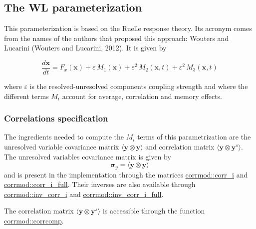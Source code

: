 \subsection*{The WL parameterization}

This parameterization is based on the Ruelle response theory. Its acronym comes from the names of the authors that proposed this approach\+: Wouters and Lucarini (Wouters and Lucarini, 2012). It is given by

\[\frac{d\boldsymbol{x}}{dt} = F_x(\boldsymbol{x}) + \varepsilon \, M_1(\boldsymbol{x}) + \varepsilon^2 \, M_2(\boldsymbol{x},t) + \varepsilon^2 \, M_3 (\boldsymbol{x},t)\]

where $\varepsilon$ is the resolved-\/unresolved components coupling strength and where the different terms $M_i$ account for average, correlation and memory effects.

\subsubsection*{Correlations specification}

The ingredients needed to compute the $M_i$ terms of this parametrization are the unresolved variable covariance matrix $\langle \boldsymbol y \otimes \boldsymbol y \rangle$ and correlation matrix $\langle \boldsymbol y \otimes \boldsymbol y^s \rangle$. The unresolved variables covariance matrix is given by \[\boldsymbol\sigma_y = \langle \boldsymbol y \otimes \boldsymbol y \rangle \] and is present in the implementation through the matrices \hyperlink{namespacecorrmod_a859a67113b5271db0df70e60cbf0687b}{corrmod\+::corr\+\_\+i} and \hyperlink{namespacecorrmod_a978b78f1d6906afe06e63768535b44f7}{corrmod\+::corr\+\_\+i\+\_\+full}. Their inverses are also available through \hyperlink{namespacecorrmod_a5a938587078064124588605255e93a19}{corrmod\+::inv\+\_\+corr\+\_\+i} and \hyperlink{namespacecorrmod_af2ab9712d246a94ae1a801a011aee3d8}{corrmod\+::inv\+\_\+corr\+\_\+i\+\_\+full}.

The correlation matrix $\langle \boldsymbol y \otimes \boldsymbol y^s \rangle$ is accessible through the function \hyperlink{namespacecorrmod_ad42bfc9c0ec2cf55958a45b46839d856}{corrmod\+::corrcomp}.

